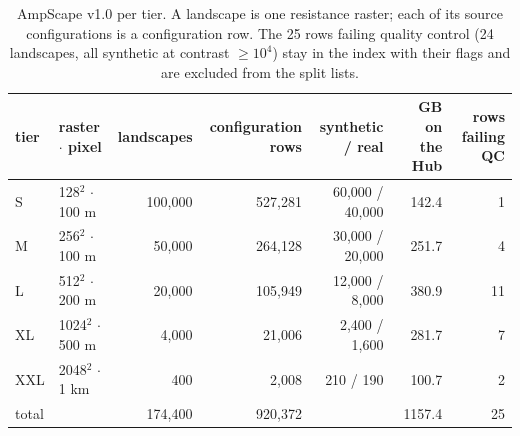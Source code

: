 \begin{table}[tb]
\centering
\footnotesize
\setlength{\tabcolsep}{3.5pt}
\caption{AmpScape v1.0 per tier. A landscape is one resistance raster; each of its source configurations is a configuration row. The 25 rows failing quality control (24 landscapes, all synthetic at contrast $\geq 10^4$) stay in the index with their flags and are excluded from the split lists.}
\label{tab:counts}
\begin{tabular}{llrrrrr}
\toprule
tier & raster $\cdot$ pixel & landscapes & configuration rows & synthetic / real & GB on the Hub & rows failing QC \\
\midrule
S & 128$^2$ $\cdot$ 100 m & 100,000 & 527,281 & 60,000 / 40,000 & 142.4 & 1 \\
M & 256$^2$ $\cdot$ 100 m & 50,000 & 264,128 & 30,000 / 20,000 & 251.7 & 4 \\
L & 512$^2$ $\cdot$ 200 m & 20,000 & 105,949 & 12,000 / 8,000 & 380.9 & 11 \\
XL & 1024$^2$ $\cdot$ 500 m & 4,000 & 21,006 & 2,400 / 1,600 & 281.7 & 7 \\
XXL & 2048$^2$ $\cdot$ 1 km & 400 & 2,008 & 210 / 190 & 100.7 & 2 \\
total &  & 174,400 & 920,372 &  & 1157.4 & 25 \\
\bottomrule
\end{tabular}
\end{table}
